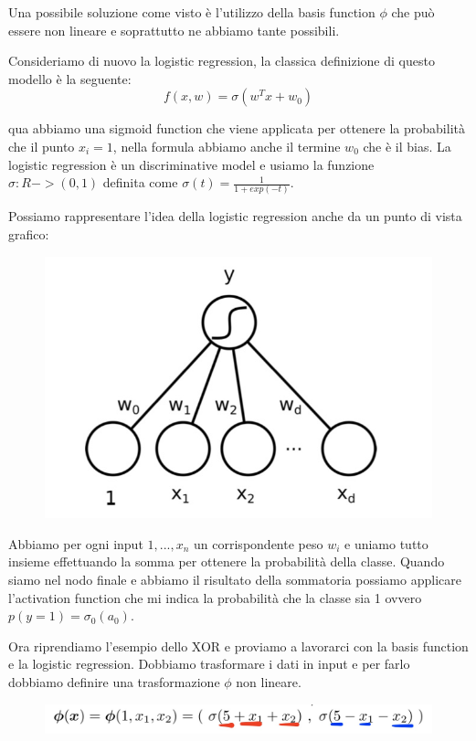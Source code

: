 \documentclass[14pt]{extreport}
\begin{document}
Una possibile soluzione come visto è l'utilizzo della basis function $\phi$ che può essere non lineare e soprattutto ne abbiamo tante possibili.

Consideriamo di nuovo la logistic regression, la classica definizione di questo modello è la seguente:
$$f(x,w) = \sigma(w^Tx + w_0)$$

qua abbiamo una sigmoid function che viene applicata per ottenere la probabilità che il punto $x_i=1$, nella formula abbiamo anche il termine $w_0$
che è il bias. La logistic regression è un discriminative model e usiamo la funzione $\sigma: R->(0,1)$ definita come $\sigma(t) =
\frac{1}{1+exp(-t)}$.

Possiamo rappresentare l'idea della logistic regression anche da un punto di vista grafico:

\begin{figure}[H]
	\centering
	\includegraphics[width=0.7\linewidth]{359.jpeg}
\end{figure}

Abbiamo per ogni input $1,...,x_n$ un corrispondente peso $w_i$ e uniamo tutto insieme effettuando la somma per ottenere la probabilità della classe.
Quando siamo nel nodo finale e abbiamo il risultato della sommatoria possiamo applicare l'activation function che mi indica la probabilità che la
classe sia 1 ovvero $p(y=1)=\sigma_0(a_0)$.

Ora riprendiamo l'esempio dello XOR e proviamo a lavorarci con la basis function e la logistic regression. Dobbiamo trasformare i dati in input e per
farlo dobbiamo definire una trasformazione $\phi$ non lineare.

\begin{figure}[H]
	\centering
	\includegraphics[width=0.7\linewidth]{360.jpeg}
\end{figure}
\end{document}
